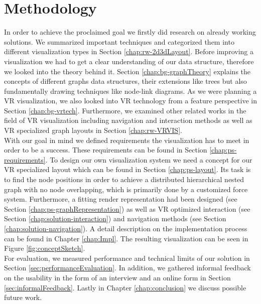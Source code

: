 \section{Methodology}
In order to achieve the proclaimed goal we firstly did research on already working solutions. We summarized important techniques and categorized them into different visualization types in Section \ref{chap:rw-2d3dLayout}. 
Before improving a visualization we had to get a clear understanding of our data structure, therefore we looked into the theory behind it. Section \ref{chap:bg-graphTheory} explains the concepts of different graphs data structures, their extensions like trees but also fundamentally drawing techniques like node-link diagrams.
As we were planning a VR visualization, we also looked into VR technology from a feature perspective in Section \ref{chap:bg-vrtech}. Furthermore, we examined other related works in the field of VR visualization including navigation and interaction methods as well as VR specialized graph layouts in Section \ref{chap:rw-VRVIS}.\\
With our goal in mind we defined requirements the visualization has to meet in order to be a success. These requirements can be found in Section \ref{chap:ps-requirements}.
To design our own visualization system we need a concept for our VR specialized layout which can be found in Section \ref{chap:ps-layout}. 
Its task is to find the node positions in order to achieve a distributed hierarchical nested graph with no node overlapping, which is primarily done by a customized force system.
Furthermore, a fitting render representation had been designed (see Section \ref{chap:ps-graphRepresentation}) as well as VR optimized interaction (see Section \ref{chap:solution-interaction}) and navigation methods (see Section \ref{chap:solution-navigation}). 
A detail description on the implementation process can be found in Chapter \ref{chap:Impl}. The resulting visualization can be seen in Figure \ref{fig:conceptSketch}.\\
For evaluation, we measured performance and technical limits of our solution in Section \ref{sec:performanceEvaluation}. In addition, we gathered informal  feedback on the usability in the form of an interview and an online form in Section \ref{sec:informalFeedback}. Lastly in Chapter \ref{chap:conclusion} we discuss possible future work.

